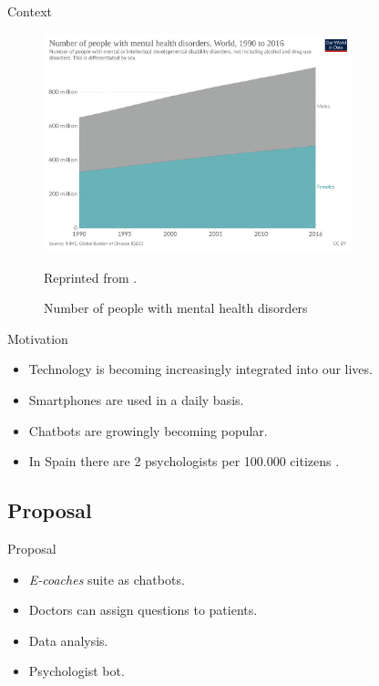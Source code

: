 \documentclass{beamer}
\begin{document}
\begin{frame}[fragile]{Context}
\begin{figure}[H]
  \centering
  \includegraphics[width=0.8\textwidth]{number_mental_health.png}
  \caption{Number of people with mental health disorders}{Reprinted from \cite{owidmentalhealth}.}
\end{figure}
\end{frame}
\begin{frame}[fragile]{Motivation}
  \begin{itemize}[<+->]
    \item Technology is becoming increasingly integrated into our lives.
    \item Smartphones are used in a daily basis.
    \item Chatbots are growingly becoming popular.
    \item In Spain there are 2 psychologists per 100.000 citizens \cite{elmundo}.
  \end{itemize}
\end{frame}
\subsection{Proposal}
\begin{frame}[fragile]{Proposal}
  \begin{itemize}[<+->]
    \item \emph{E-coaches} suite as chatbots.
    \item Doctors can assign questions to patients.
    \item Data analysis.
    \item Psychologist bot.
  \end{itemize}
\end{frame}
\end{document}

